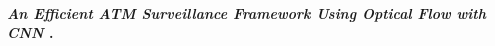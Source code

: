 \paragraph{
    \textbf{\emph{An Efficient ATM Surveillance
    Framework Using Optical Flow
    with CNN}
    }
    \cite[pág. 39]{chaudhary_microservices_2020}.
}